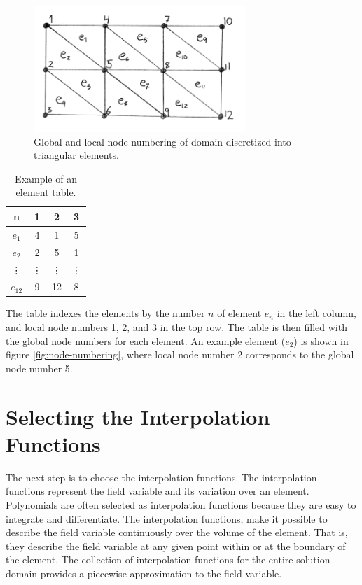 \begin{figure}
  \centering
  \includegraphics[width=8cm]{./images/finite_element_method_node_numbering.png}
\caption{Global and local node numbering of domain discretized into
  triangular elements.}
\label{fig:node-numbering}
\end{figure}

\begin{table}
  \centering
\begin{tabular}{c|c|c|c|}
n & 1 & 2 & 3 \\
\hline
$e_1$ & 4 & 1 & 5 \\
$e_2$ & 2 & 5 & 1 \\
\vdots & \vdots & \vdots & \vdots \\
$e_{12}$ & 9 & 12 & 8 \\
\hline
\end{tabular}
\caption{Example of an element table.}
\label{table:element-table}
\end{table}

The table indexes the elements by the number $n$ of element $e_n$
in the left column, and local node numbers 1, 2, and 3 in the top
row. The table is then filled with the global node numbers for each
element. An example element ($e_2$) is shown in figure
\vref{fig:node-numbering}, where local node number 2 corresponds to the
global node number 5. 

\section{Selecting the Interpolation Functions}
\label{sec:selecting_interpolation_function}
The next step is to choose the interpolation functions. The
interpolation functions represent the field variable and its
variation over an element. Polynomials are often selected as
interpolation functions because they are easy to integrate and
differentiate.
%
The interpolation functions, make it possible to describe the field
variable continuously over the volume of the element. That is, they
describe the field variable at any given point within or at the
boundary of the element.
%
The collection of interpolation functions for the entire solution
domain provides a piecewise approximation to the field variable.

